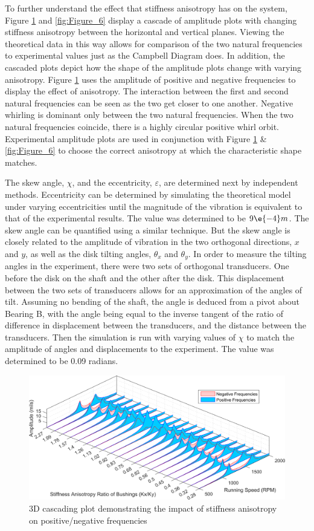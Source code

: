 		To further understand the effect that stiffness anisotropy has on the system, Figure \ref{fig:Figure_5} and \ref{fig:Figure_6}  display a cascade of amplitude plots with changing stiffness anisotropy between the horizontal and vertical planes. Viewing the theoretical data in this way allows for comparison of the two natural frequencies to experimental values just as the Campbell Diagram does. In addition, the cascaded plots depict how the shape of the amplitude plots change with varying anisotropy. Figure \ref{fig:Figure_5}  uses the amplitude of positive and negative frequencies to display the effect of anisotropy. The interaction between the first and second natural frequencies can be seen as the two get closer to one another. Negative whirling is dominant only between the two natural frequencies. When the two natural frequencies coincide, there is a highly circular positive whirl orbit. Experimental amplitude plots are used in conjunction with Figure \ref{fig:Figure_5}  \& \ref{fig:Figure_6}  to choose the correct anisotropy at which the characteristic shape matches.\par 
		The skew angle, $\chi$, and the eccentricity, $\varepsilon$, are determined next by independent methods. Eccentricity can be determined by simulating the theoretical model under varying eccentricities until the magnitude of the vibration is equivalent to that of the experimental results. The value was determined to be $9\e{-4}  m$. The skew angle can be quantified using a similar technique. But the skew angle is closely related to the amplitude of vibration in the two orthogonal directions, $x$ and $y$, as well as the disk tilting angles, $\theta_x$ and $\theta_y$. In order to measure the tilting angles in the experiment, there were two sets of orthogonal transducers. One before the disk on the shaft and the other after the disk. This displacement between the two sets of transducers allows for an approximation of the angles of tilt. Assuming no bending of the shaft, the angle is deduced from a pivot about Bearing B, with the angle being equal to the inverse tangent of the ratio of difference in displacement between the transducers, and the distance between the transducers. Then the simulation is run with varying values of $\chi$ to match the amplitude of angles and displacements to the experiment. The value was determined to be 0.09 radians.\par 
		\begin{figure}[H]
			\centering
			\includegraphics[width=.75\linewidth]{./figures/Images/Figure_5}
			\caption{3D cascading plot demonstrating the impact of stiffness anisotropy on positive/negative frequencies}
			\label{fig:Figure_5}
		\end{figure}
